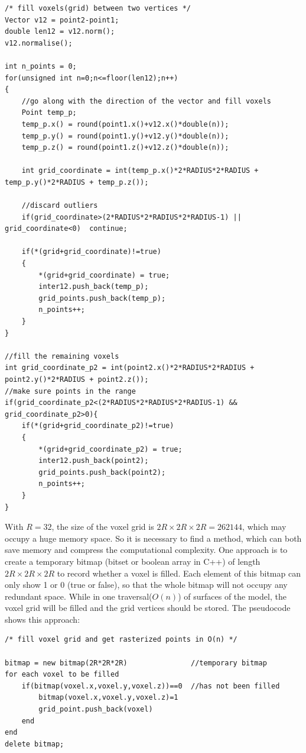 \begin{lstlisting}[xleftmargin=1em]
/* fill voxels(grid) between two vertices */
Vector v12 = point2-point1;
double len12 = v12.norm();
v12.normalise();

int n_points = 0;
for(unsigned int n=0;n<=floor(len12);n++)
{
    //go along with the direction of the vector and fill voxels
	Point temp_p;
	temp_p.x() = round(point1.x()+v12.x()*double(n));
	temp_p.y() = round(point1.y()+v12.y()*double(n));
	temp_p.z() = round(point1.z()+v12.z()*double(n));

	int grid_coordinate	= int(temp_p.x()*2*RADIUS*2*RADIUS + temp_p.y()*2*RADIUS + temp_p.z());

	//discard outliers
	if(grid_coordinate>(2*RADIUS*2*RADIUS*2*RADIUS-1) || grid_coordinate<0)  continue; 

	if(*(grid+grid_coordinate)!=true)
	{
		*(grid+grid_coordinate) = true;
		inter12.push_back(temp_p);
		grid_points.push_back(temp_p);
		n_points++;
	}
}

//fill the remaining voxels
int grid_coordinate_p2 = int(point2.x()*2*RADIUS*2*RADIUS + point2.y()*2*RADIUS + point2.z());
//make sure points in the range
if(grid_coordinate_p2<(2*RADIUS*2*RADIUS*2*RADIUS-1) && grid_coordinate_p2>0){
	if(*(grid+grid_coordinate_p2)!=true)
	{
		*(grid+grid_coordinate_p2) = true;
		inter12.push_back(point2);
		grid_points.push_back(point2);
		n_points++;
	} 
}
\end{lstlisting}

With $R = 32$, the size of the voxel grid is $2R\times2R\times2R = 262144$, which may occupy a huge memory space. So it is necessary to find a method, which can both save memory and compress the computational complexity. One approach is to create a temporary bitmap (bitset or boolean array in C++) of length $2R\times2R\times2R$ to record whether a voxel is filled. Each element of this bitmap can only show 1 or 0 (true or false), so that the whole bitmap will not occupy any redundant space. While in one traversal($O(n)$) of surfaces of the model, the voxel grid will be filled and the grid vertices should be stored. The pseudocode shows this approach: 

\begin{lstlisting}[xleftmargin=1em]
/* fill voxel grid and get rasterized points in O(n) */

bitmap = new bitmap(2R*2R*2R)               //temporary bitmap
for each voxel to be filled
    if(bitmap(voxel.x,voxel.y,voxel.z))==0  //has not been filled
        bitmap(voxel.x,voxel.y,voxel.z)=1
        grid_point.push_back(voxel)
    end
end
delete bitmap;
\end{lstlisting}

